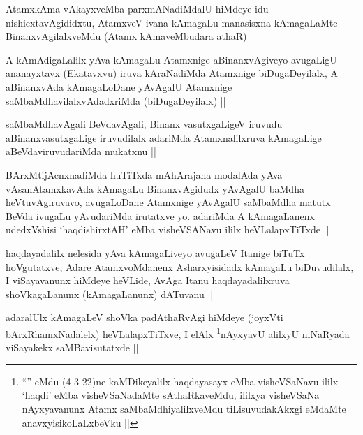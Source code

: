 \begin{artha}
AtamxkAma vAkayxveMba parxmANadiMdalU hiMdeye idu nishicxtavAgididxtu,
AtamxveV ivana kAmagaLu manasisxna kAmagaLaMte BinanxvAgilalxveMdu
(Atamx kAmaveMbudara athaR)
\end{artha}


\begin{artha}
A kAmAdigaLalilx yAva kAmagaLu Atamxnige aBinanxvAgiveyo avugaLigU
ananayxtavx (Ekatavxvu) iruva kAraNadiMda Atamxnige biDugaDeyilalx, A
aBinanxvAda kAmagaLoDane yAvAgalU Atamxnige saMbaMdhavilalxvAdadxriMda
(biDugaDeyilalx) ||
\end{artha}


\begin{artha}
saMbaMdhavAgali BeVdavAgali, Binanx vasutxgaLigeV iruvudu
aBinanxvasutxgaLige iruvudilalx adariMda Atamxnalilxruva kAmagaLige
aBeVdaviruvudariMda mukatxnu ||
\end{artha}


\begin{artha}
BArxMtijAcnxnadiMda huTiTxda mAhArajana modalAda yAva vAsanAtamxkavAda
kAmagaLu BinanxvAgidudx yAvAgalU baMdha heVtuvAgiruvavo, avugaLoDane
Atamxnige yAvAgalU saMbaMdha matutx BeVda ivugaLu yAvudariMda
irutatxve yo. adariMda  A kAmagaLanenx udedxVshisi `haqdishirxtAH'
eMba visheVSANavu ililx heVLalapxTiTxde ||
\end{artha}

\begin{artha}
haqdayadalilx nelesida yAva kAmagaLiveyo avugaLeV Itanige biTuTx
hoVgutatxve, Adare AtamxvoMdanenx Asharxyisidadx kAmagaLu
biDuvudilalx, I viSayavanunx hiMdeye heVLide, AvAga Itanu
haqdayadalilxruva shoVkagaLanunx (kAmagaLanunx) dATuvanu ||
\end{artha}


\begin{artha}
adaralUlx kAmagaLeV shoVka padAthaRvAgi hiMdeye (joyxVti
bArxRhamxNadalelx) heVLalapxTiTxve, I elAlx \footnote{``\stext'' eMdu
  (4-3-22)ne kaMDikeyalilx haqdayasayx eMba visheVSaNavu ililx `haqdi'
  eMba visheVSaNadaMte sAthaRkaveMdu, ililxya visheVSaNa nAyxyavanunx
  Atamx saMbaMdhiyalilxveMdu tiLisuvudakAkxgi eMdaMte
  anavxyisikoLaLxbeVku ||}nAyxyavU alilxyU niNaRyada viSayakekx saMBavisutatxde ||
\end{artha}

